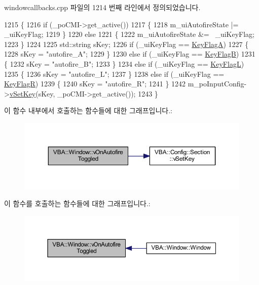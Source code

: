 windowcallbacks.\+cpp 파일의 1214 번째 라인에서 정의되었습니다.


\begin{DoxyCode}
1215 \{
1216   \textcolor{keywordflow}{if} (\_poCMI->get\_active())
1217   \{
1218     m\_uiAutofireState |= \_uiKeyFlag;
1219   \}
1220   \textcolor{keywordflow}{else}
1221   \{
1222     m\_uiAutofireState &= ~\_uiKeyFlag;
1223   \}
1224 
1225   std::string sKey;
1226   \textcolor{keywordflow}{if} (\_uiKeyFlag == \mbox{\hyperlink{class_v_b_a_a20a8479ee93dc52b1fbd911a13cb30a5a4006161734414cc3ea97edc3105c8231}{KeyFlagA}})
1227   \{
1228     sKey = \textcolor{stringliteral}{"autofire\_A"};
1229   \}
1230   \textcolor{keywordflow}{else} \textcolor{keywordflow}{if} (\_uiKeyFlag == \mbox{\hyperlink{class_v_b_a_a20a8479ee93dc52b1fbd911a13cb30a5a94baf7a0d970d139d3617120b54dd2b9}{KeyFlagB}})
1231   \{
1232     sKey = \textcolor{stringliteral}{"autofire\_B"};
1233   \}
1234   \textcolor{keywordflow}{else} \textcolor{keywordflow}{if} (\_uiKeyFlag == \mbox{\hyperlink{class_v_b_a_a20a8479ee93dc52b1fbd911a13cb30a5ad04b7c8e1cf8bb6053010c681bfa253d}{KeyFlagL}})
1235   \{
1236     sKey = \textcolor{stringliteral}{"autofire\_L"};
1237   \}
1238   \textcolor{keywordflow}{else} \textcolor{keywordflow}{if} (\_uiKeyFlag == \mbox{\hyperlink{class_v_b_a_a20a8479ee93dc52b1fbd911a13cb30a5ae74198fb73e9b0d06aca1dedcac42732}{KeyFlagR}})
1239   \{
1240     sKey = \textcolor{stringliteral}{"autofire\_R"};
1241   \}
1242   m\_poInputConfig->\mbox{\hyperlink{class_v_b_a_1_1_config_1_1_section_a57e1b95cbea40db71c093381beff4b0e}{vSetKey}}(sKey, \_poCMI->get\_active());
1243 \}
\end{DoxyCode}
이 함수 내부에서 호출하는 함수들에 대한 그래프입니다.\+:
\nopagebreak
\begin{figure}[H]
\begin{center}
\leavevmode
\includegraphics[width=350pt]{class_v_b_a_1_1_window_a7267bdc270816ef841f3fe1bcfd03f27_cgraph}
\end{center}
\end{figure}
이 함수를 호출하는 함수들에 대한 그래프입니다.\+:
\nopagebreak
\begin{figure}[H]
\begin{center}
\leavevmode
\includegraphics[width=350pt]{class_v_b_a_1_1_window_a7267bdc270816ef841f3fe1bcfd03f27_icgraph}
\end{center}
\end{figure}
